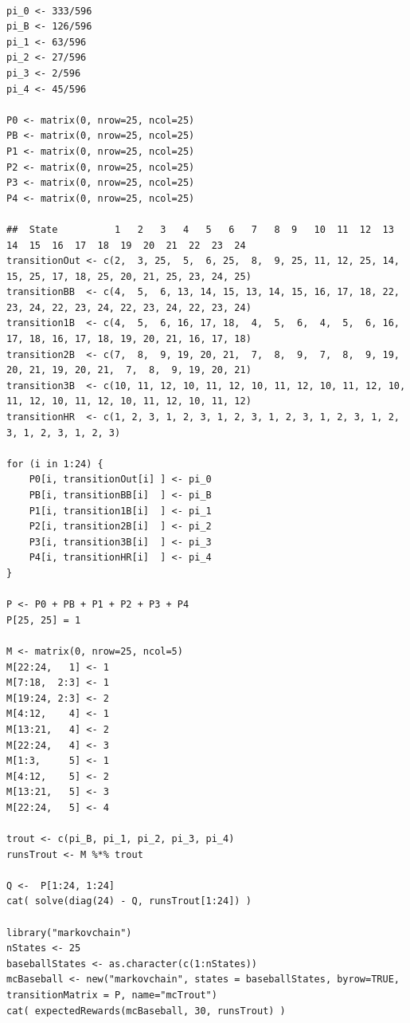 \documentclass[12pt]{article}
\begin{document}
\begin{lstlisting}

pi_0 <- 333/596
pi_B <- 126/596
pi_1 <- 63/596
pi_2 <- 27/596
pi_3 <- 2/596
pi_4 <- 45/596

P0 <- matrix(0, nrow=25, ncol=25)
PB <- matrix(0, nrow=25, ncol=25)
P1 <- matrix(0, nrow=25, ncol=25)
P2 <- matrix(0, nrow=25, ncol=25)
P3 <- matrix(0, nrow=25, ncol=25)
P4 <- matrix(0, nrow=25, ncol=25)

##  State          1   2   3   4   5   6   7   8  9   10  11  12  13  14  15  16  17  18  19  20  21  22  23  24
transitionOut <- c(2,  3, 25,  5,  6, 25,  8,  9, 25, 11, 12, 25, 14, 15, 25, 17, 18, 25, 20, 21, 25, 23, 24, 25)
transitionBB  <- c(4,  5,  6, 13, 14, 15, 13, 14, 15, 16, 17, 18, 22, 23, 24, 22, 23, 24, 22, 23, 24, 22, 23, 24)
transition1B  <- c(4,  5,  6, 16, 17, 18,  4,  5,  6,  4,  5,  6, 16, 17, 18, 16, 17, 18, 19, 20, 21, 16, 17, 18)
transition2B  <- c(7,  8,  9, 19, 20, 21,  7,  8,  9,  7,  8,  9, 19, 20, 21, 19, 20, 21,  7,  8,  9, 19, 20, 21)
transition3B  <- c(10, 11, 12, 10, 11, 12, 10, 11, 12, 10, 11, 12, 10, 11, 12, 10, 11, 12, 10, 11, 12, 10, 11, 12)
transitionHR  <- c(1, 2, 3, 1, 2, 3, 1, 2, 3, 1, 2, 3, 1, 2, 3, 1, 2, 3, 1, 2, 3, 1, 2, 3)

for (i in 1:24) {
    P0[i, transitionOut[i] ] <- pi_0
    PB[i, transitionBB[i]  ] <- pi_B
    P1[i, transition1B[i]  ] <- pi_1
    P2[i, transition2B[i]  ] <- pi_2
    P3[i, transition3B[i]  ] <- pi_3
    P4[i, transitionHR[i]  ] <- pi_4
}

P <- P0 + PB + P1 + P2 + P3 + P4
P[25, 25] = 1

M <- matrix(0, nrow=25, ncol=5)
M[22:24,   1] <- 1
M[7:18,  2:3] <- 1
M[19:24, 2:3] <- 2
M[4:12,    4] <- 1
M[13:21,   4] <- 2
M[22:24,   4] <- 3
M[1:3,     5] <- 1
M[4:12,    5] <- 2
M[13:21,   5] <- 3
M[22:24,   5] <- 4

trout <- c(pi_B, pi_1, pi_2, pi_3, pi_4)
runsTrout <- M %*% trout

Q <-  P[1:24, 1:24]
cat( solve(diag(24) - Q, runsTrout[1:24]) )

library("markovchain")
nStates <- 25
baseballStates <- as.character(c(1:nStates))
mcBaseball <- new("markovchain", states = baseballStates, byrow=TRUE, transitionMatrix = P, name="mcTrout")
cat( expectedRewards(mcBaseball, 30, runsTrout) )
\end{lstlisting}

\hr

\end{document}
